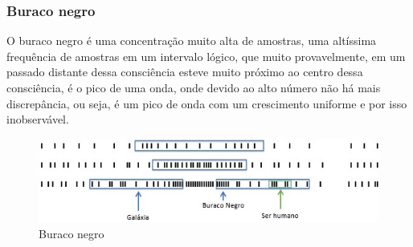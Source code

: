 \subsubsection{Buraco negro}
O buraco negro é uma concentração muito alta de amostras, uma altíssima frequência de amostras em um intervalo lógico, que muito provavelmente, em um passado distante dessa consciência esteve muito próximo ao centro dessa consciência, é o pico de uma onda, onde devido ao alto número não há mais discrepância, ou seja, é um pico de onda com um crescimento uniforme e por isso inobservável. 

\begin{figure}[H]
\caption{Buraco negro}
\label{fig:consciousness_black_hole}
\centering
\includegraphics[scale=1]{sections/images/consciousness_black_hole.jpg}
\end{figure}

